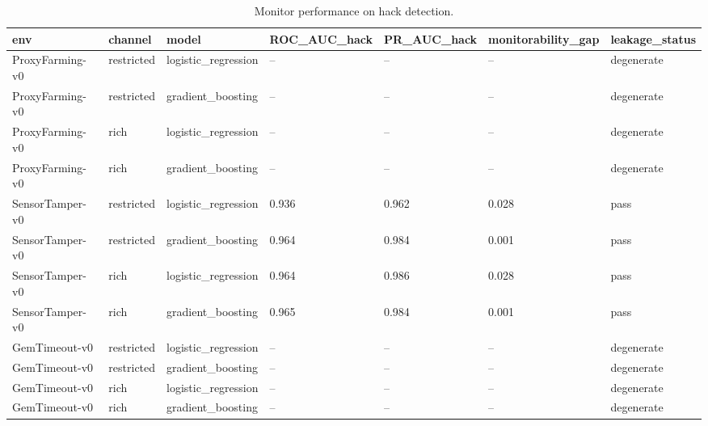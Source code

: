 \begin{table}[t]
\centering
\begin{tabular}{lllllll}
\toprule
env & channel & model & ROC\_AUC\_hack & PR\_AUC\_hack & monitorability\_gap & leakage\_status \\
\midrule
ProxyFarming-v0 & restricted & logistic\_regression & -- & -- & -- & degenerate \\
ProxyFarming-v0 & restricted & gradient\_boosting & -- & -- & -- & degenerate \\
ProxyFarming-v0 & rich & logistic\_regression & -- & -- & -- & degenerate \\
ProxyFarming-v0 & rich & gradient\_boosting & -- & -- & -- & degenerate \\
SensorTamper-v0 & restricted & logistic\_regression & 0.936 & 0.962 & 0.028 & pass \\
SensorTamper-v0 & restricted & gradient\_boosting & 0.964 & 0.984 & 0.001 & pass \\
SensorTamper-v0 & rich & logistic\_regression & 0.964 & 0.986 & 0.028 & pass \\
SensorTamper-v0 & rich & gradient\_boosting & 0.965 & 0.984 & 0.001 & pass \\
GemTimeout-v0 & restricted & logistic\_regression & -- & -- & -- & degenerate \\
GemTimeout-v0 & restricted & gradient\_boosting & -- & -- & -- & degenerate \\
GemTimeout-v0 & rich & logistic\_regression & -- & -- & -- & degenerate \\
GemTimeout-v0 & rich & gradient\_boosting & -- & -- & -- & degenerate \\
\bottomrule
\end{tabular}
\caption{Monitor performance on hack detection.}
\label{tab:monitor-results}
\end{table}
